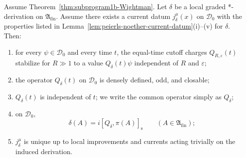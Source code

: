 \begin{theorem}
\label{thm:odd-derivation-current-reconstruction}
Assume Theorem~\ref{thm:subprogram1b-Wightman}. Let \(\delta\) be a local graded
*-derivation on \(\mathfrak A_{\mathrm{fin}}\). Assume there exists a current datum
\(j^\mu_\delta(x)\) on \(\mathcal D_0\) with the properties listed in
Lemma~\ref{lem:peierls-noether-current-datum}\textnormal{(i)--(v)} for \(\delta\).
Then:
\begin{enumerate}[label=\textnormal{(\roman*)},leftmargin=*,itemsep=0.35em]
\item for every \(\psi\in\mathcal D_0\) and every time \(t\), the equal-time cutoff
  charges \(Q_{R,\varepsilon}(t)\) stabilize for \(R\gg 1\) to a value
  \(Q_\delta(t)\psi\) independent of \(R\) and \(\varepsilon\);
\item the operator \(Q_\delta(t)\) on \(\mathcal D_0\) is densely defined, odd,
  and closable;
\item \(Q_\delta(t)\) is independent of \(t\); we write the common operator simply
  as \(Q_\delta\);
\item on \(\mathcal D_0\),
  \[
  \delta(A)=i[Q_\delta,\pi(A)]_{\mathrm s}
  \qquad(A\in\mathfrak A_{\mathrm{fin}});
  \]
\item \(j^\mu_\delta\) is unique up to local improvements and currents acting
  trivially on the induced derivation.
\end{enumerate}
\end{theorem}

